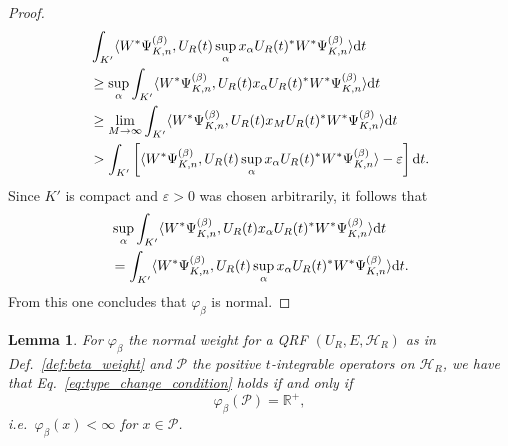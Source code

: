 \documentclass[sn-mathphys-num]{sn-jnl}%
\newcommand{\RR}{\mathbb{R}}
\newcommand{\HH}{\mathcal{H}}
\newcommand{\diff}{\textup{d}}
\numberwithin{equation}{section}
\theoremstyle{thmstyleone}%
\newtheorem{lemma}[theorem]{Lemma}
\theoremstyle{thmstyletwo}%
\theoremstyle{thmstylethree}%
\begin{document}
\begin{proof}
    \begin{align}
        &\int_{K'} \langle W^*\Psi_{K,n}^{(\beta)},U_R(t)\sup_\alpha x_\alpha U_R(t)^*W^*\Psi_{K,n}^{(\beta)}\rangle\diff t\nonumber\\
        &\geq \sup_\alpha\int_{K'} \langle W^*\Psi_{K,n}^{(\beta)},U_R(t) x_\alpha U_R(t)^*W^*\Psi_{K,n}^{(\beta)}\rangle\diff t\nonumber\\
        &\geq\lim_{M\to\infty}\int_{K'} \langle W^*\Psi_{K,n}^{(\beta)},U_R(t) x_M U_R(t)^*W^*\Psi_{K,n}^{(\beta)}\rangle\diff t\nonumber\\
        &>\int_{K'} \left[\langle W^*\Psi_{K,n}^{(\beta)},U_R(t) \sup_\alpha x_\alpha U_R(t)^*W^*\Psi_{K,n}^{(\beta)}\rangle-\varepsilon\right]\diff t.
    \end{align}
    Since $K'$ is compact and $\varepsilon>0$ was chosen arbitrarily, it follows that
    \begin{align}
        &\sup_\alpha\int_{K'} \langle W^*\Psi_{K,n}^{(\beta)},U_R(t) x_\alpha U_R(t)^*W^*\Psi_{K,n}^{(\beta)}\rangle\diff t\nonumber\\
        &=\int_{K'} \langle W^*\Psi_{K,n}^{(\beta)},U_R(t) \sup_\alpha x_\alpha U_R(t)^*W^*\Psi_{K,n}^{(\beta)}\rangle\diff t.
    \end{align}
    From this one concludes that $\varphi_\beta$ is normal.    
\end{proof}
\begin{lemma}
    \label{lem:weight_type_change}
    For $\varphi_\beta$ the normal weight for a QRF $(U_R,E,\HH_R)$ as in Def.\ \ref{def:beta_weight} and $\mathcal{P}$ the positive $t$-integrable operators on $\HH_R$, we have that Eq.\ \eqref{eq:type_change_condition} holds if and only if 
    \begin{equation}
        \varphi_\beta(\mathcal{P})=\RR^+,
    \end{equation}
    i.e.\ $\varphi_\beta(x)<\infty$ for $x\in\mathcal{P}$.
\end{lemma}
\end{document}
